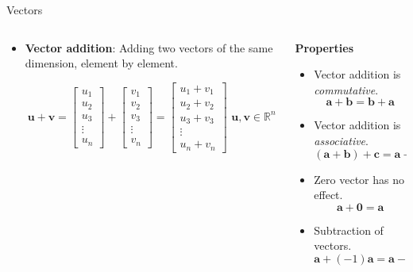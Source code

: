 \documentclass[aspectratio=169]{beamer}
\let\olditem\item
\renewcommand{\item}{\setlength{\itemsep}{\fill}\olditem}
\begin{document}
\begin{frame}[t]{Vectors}
\begin{columns}[T]
\begin{column}{0.5\textwidth}
\begin{itemize}
\item \textbf{Vector addition}: Adding two vectors of the same dimension, element by element.
\begin{small}
$$ \mathbf{u} + \mathbf{v} = \begin{bmatrix} u_1 \\ u_2 \\ u_3 \\ \vdots \\ u_n \end{bmatrix} + \begin{bmatrix} v_1 \\ v_2 \\ v_3 \\ \vdots \\ v_n \end{bmatrix}= \begin{bmatrix} u_1 + v_1 \\ u_2 + v_2 \\ u_3 + v_3 \\ \vdots \\ u_n + v_n \end{bmatrix} \,\, \mathbf{u}, \mathbf{v} \in \mathbb{R}^n$$
\end{small}
\end{itemize}
\vspace{-0.55cm} 
\begin{center}
\end{center}
\end{column}
\begin{column}{0.5\textwidth}
\textbf{Properties}
\begin{itemize}
\item Vector addition is \textit{commutative}.
$$ \mathbf{a} + \mathbf{b} = \mathbf{b} + \mathbf{a} $$
\item Vector addition is \textit{associative}.
$$ \left(\mathbf{a} + \mathbf{b}\right) + \mathbf{c} =  \mathbf{a} + \left(\mathbf{b} + \mathbf{c} \right) $$
\item Zero vector has no effect.
$$ \mathbf{a} + \mathbf{0} = \mathbf{a} $$
\item Subtraction of vectors. 
$$ \mathbf{a} + (-1)\mathbf{a} = \mathbf{a} - \mathbf{a} = \mathbf{0} $$
\end{itemize}
\end{column}
\end{columns}
\end{frame}
\end{document}
